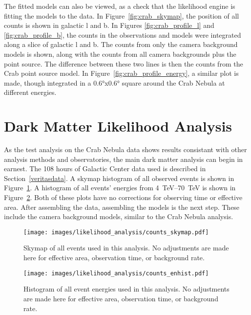   The fitted models can also be viewed, as a check that the likelihood engine is fitting the models to the data.
  In Figure~\ref{fig:crab_skymap}, the position of all counts is shown in galactic l and b.
  In Figures \ref{fig:crab_profile_l} and \ref{fig:crab_profile_b}, the counts in the observations and models were integrated along a slice of galactic l and b.
  The counts from only the camera background models is shown, along with the counts from all camera backgrounds plus the point source.
  The difference between these two lines is then the counts from the Crab point source model.
  In Figure~\ref{fig:crab_profile_energy}, a similar plot is made, though integrated in a \ang{0.6}x\ang{0.6} square around the Crab Nebula at different energies.

  \FloatBarrier

\section{Dark Matter Likelihood Analysis}\label{sec:dmlike}
  
  As the test analysis on the Crab Nebula data shows results consistant with other analysis methods and observatories, the main dark matter analysis can begin in earnest.
  The 108 hours of Galactic Center data used is described in Section~\ref{veritasdata}.
  A skymap histogram of all observed events is shown in Figure~\ref{fig:gc_counts_skymap}.
  A histogram of all events' energies from \SIrange{4}{70}{TeV} is shown in Figure~\ref{fig:gc_counts_enhist}.
  Both of these plots have no corrections for observing time or effective area.
  After assembling the data, assembling the models is the next step.
  These include the camera background models, similar to the Crab Nebula analysis.
  
  \begin{figure}[ht]
    \centering
    \texttt{[image: images/likelihood\_analysis/counts\_skymap.pdf]}
    \caption[Galactic Center Counts Skymap]{
      Skymap of all events used in this analysis.
      No adjustments are made here for effective area, observation time, or background rate.
    }
    \label{fig:gc_counts_skymap}
  \end{figure}
  
  \begin{figure}[h]
    \centering
    \texttt{[image: images/likelihood\_analysis/counts\_enhist.pdf]}
    \caption[Galactic Center Counts Energy Histogram]{
      Histogram of all event energies used in this analysis.
      No adjustments are made here for effective area, observation time, or background rate.
    }
    \label{fig:gc_counts_enhist}
  \end{figure}

